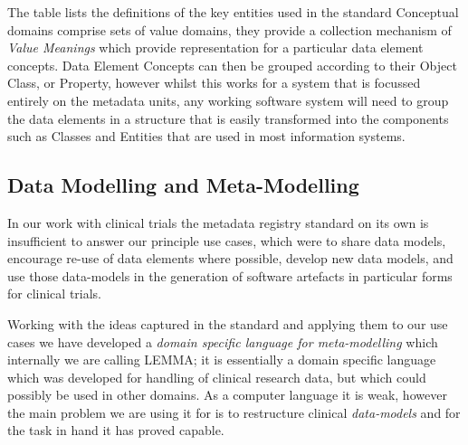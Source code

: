 The table lists the definitions of the key entities used in the standard
Conceptual domains comprise sets of value domains, they provide a collection mechanism of \emph{Value Meanings} which provide representation for a particular data element concepts. Data Element Concepts can then be grouped according to their Object Class, or Property, however whilst this works for a system that is focussed entirely on the metadata units, any working software system will need to group the data elements in a structure that is easily transformed into the components such as Classes and Entities that are used in most information systems.   



\subsection{Data Modelling and Meta-Modelling}
In our work with clinical trials the metadata registry standard on its own is insufficient to answer our principle use cases, which were to share data models, encourage re-use of data elements where possible, develop new data models, and use those data-models in the generation of software artefacts in particular forms for clinical trials.

Working with the ideas captured in the standard and applying them to our use cases we have developed a \emph{domain specific language for meta-modelling} which internally we are calling LEMMA; it is essentially a domain specific language which was developed for handling of clinical research data, but which could possibly be used in other domains. As a computer language it is  weak, however the main problem we are using it for is to restructure clinical \emph{data-models} and for the task in hand it has proved capable.

